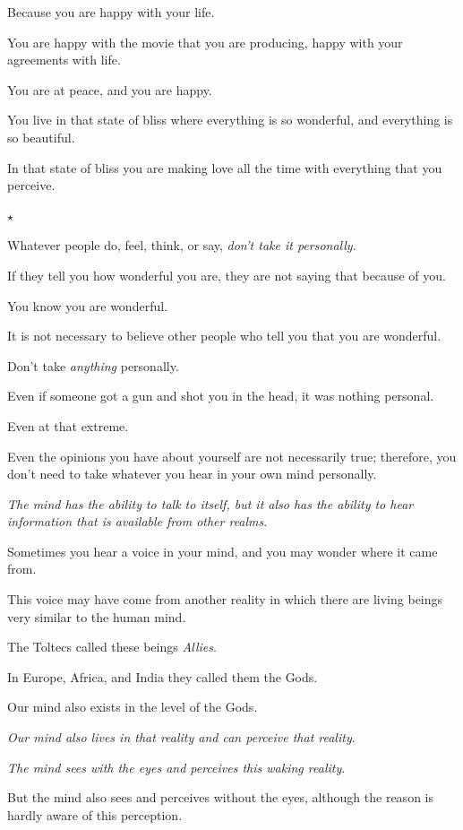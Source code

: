 \documentclass{article}
\numberwithin{equation}{section}
\begin{document}
Because you are happy with your life.

You are happy with the movie that you are producing, happy with your agreements with life.

You are at peace, and you are happy.

You live in that state of bliss where everything is so wonderful, and everything is so beautiful.

In that state of bliss you are making love all the time with everything that you perceive.
\begin{center}
    $\star$
\end{center}

Whatever people do, feel, think, or say, \textit{don't take it personally}.

If they tell you how wonderful you are, they are not saying that because of you.

You know you are wonderful.

It is not necessary to believe other people who tell you that you are wonderful.

Don't take \textit{anything} personally.

Even if someone got a gun and shot you in the head, it was nothing personal.

Even at that extreme.

%
Even the opinions you have about yourself are not necessarily true; therefore, you don't need to take whatever you hear in your own mind personally.

\textit{The mind has the ability to talk to itself, but it also has the ability to hear information that is available from other realms}.

Sometimes you hear a voice in your mind, and you may wonder where it came from.

This voice may have come from another reality in which there are living beings very similar to the human mind.

The Toltecs called these beings \textit{Allies}.

In Europe, Africa, and India they called them the Gods.

%
Our mind also exists in the level of the Gods.

\textit{Our mind also lives in that reality and can perceive that reality}.

\textit{The mind sees with the eyes and perceives this waking reality}.

But the mind also sees and perceives without the eyes, although the reason is hardly aware of this perception.
\end{document}
